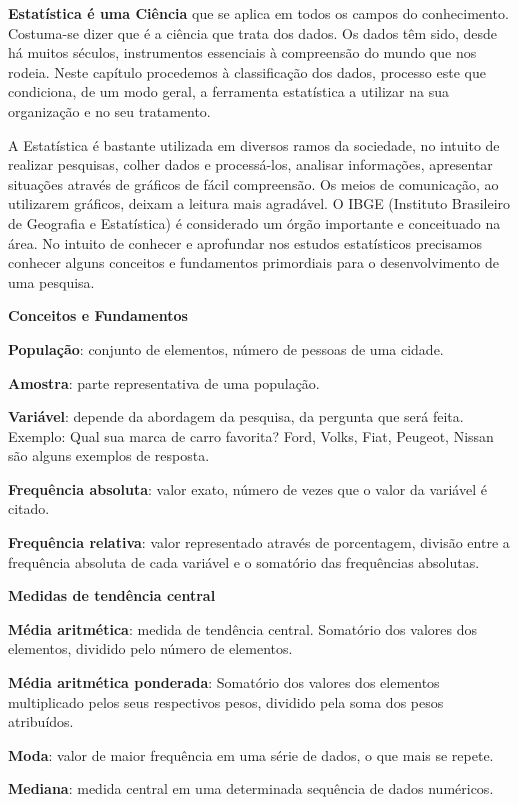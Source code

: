 \begin{multicols*}{2}
    \textbf{ Estatística é uma Ciência} que se aplica em todos os campos do conhecimento. Costuma-se dizer que é a ciência que trata dos dados. Os dados têm sido, desde há muitos séculos, instrumentos essenciais à compreensão do mundo que nos rodeia. Neste capítulo procedemos à classificação dos dados, processo este que condiciona, de um modo geral, a ferramenta estatística a utilizar na sua organização e no seu tratamento.

    A Estatística é bastante utilizada em diversos ramos da sociedade, no intuito de realizar pesquisas, colher dados e processá-los, analisar informações, apresentar situações através de gráficos de fácil compreensão. Os meios de comunicação, ao utilizarem gráficos, deixam a leitura mais agradável. O IBGE (Instituto Brasileiro de Geografia e Estatística) é considerado um órgão importante e conceituado na área. No intuito de conhecer e aprofundar nos estudos estatísticos precisamos conhecer alguns conceitos e fundamentos primordiais para o desenvolvimento de uma pesquisa.

    \textbf{Conceitos e Fundamentos}

    \textbf{População}: conjunto de elementos, número de pessoas de uma cidade.

    \textbf{Amostra}: parte representativa de uma população.

    \textbf{Variável}: depende da abordagem da pesquisa, da pergunta que será feita. Exemplo: Qual sua marca de carro favorita? Ford, Volks, Fiat, Peugeot, Nissan são alguns exemplos de resposta.

    \textbf{Frequência absoluta}: valor exato, número de vezes que o valor da variável é citado.

    \textbf{Frequência relativa}: valor representado através de porcentagem, divisão entre a frequência absoluta de cada variável e o somatório das frequências absolutas.

    \textbf{Medidas de tendência central}

    \textbf{Média aritmética}: medida de tendência central. Somatório dos valores dos elementos, dividido pelo número de elementos.

    \textbf{Média aritmética ponderada}: Somatório dos valores dos elementos multiplicado pelos seus respectivos pesos, dividido pela soma dos pesos atribuídos.

    \textbf{Moda}: valor de maior frequência em uma série de dados, o que mais se repete.

    \textbf{Mediana}: medida central em uma determinada sequência de dados numéricos.


\end{multicols*}
